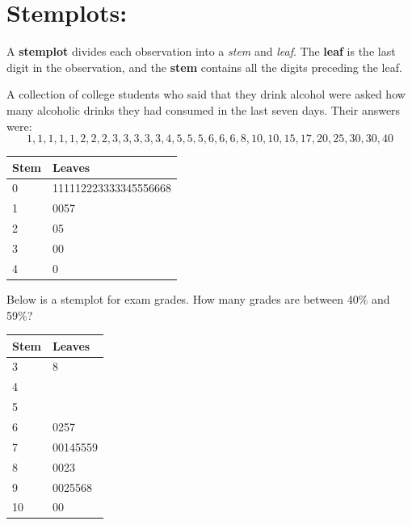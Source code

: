 \documentclass[../mathNotesPreamble]{subfiles}
\begin{document}
  \section*{Stemplots:}
  \begin{defn*}
    A \textbf{stemplot} divides each observation into a \emph{stem} and \emph{leaf}. The \textbf{leaf} is the last digit in the observation, and the \textbf{stem} contains all the digits preceding the leaf.
  \end{defn*}
  \begin{ex*}
    A collection of college students who said that they drink alcohol were asked how many alcoholic drinks they had consumed in the last seven days. Their answers were:
    \[1, 1, 1, 1, 1, 2, 2, 2, 3, 3, 3, 3, 3, 4, 5, 5, 5, 6, 6, 6, 8, 10, 10, 15, 17, 20, 25, 30, 30, 40\]
  \end{ex*}
  \begin{center}
    \begin{tabular}{@{}ll@{}}\toprule
      Stem& Leaves\\\midrule
      0& 111112223333345556668\\
      1& 0057\\
      2& 05\\
      3& 00\\
      4& 0\\\bottomrule
    \end{tabular}
  \end{center}
  
  \begin{ex*}
    Below is a stemplot for exam grades. How many grades are between 40\% and 59\%?
  \end{ex*}
  \begin{center}
    \begin{tabular}{@{}ll@{}}\toprule
      Stem& Leaves\\\midrule
      3& 8\\
      4& \\
      5& \\
      6& 0257\\
      7& 00145559\\
      8& 0023\\
      9& 0025568\\
      10& 00\\\bottomrule
    \end{tabular}
  \end{center}

  \pagebreak
\end{document}
